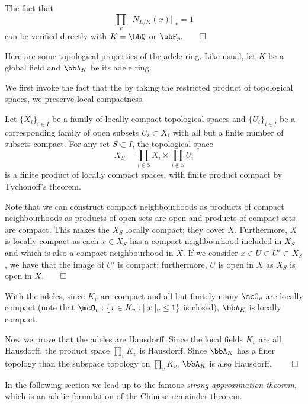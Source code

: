 \documentclass[a4paper, 12pt,oneside,openany]{book}
\begin{document}
The fact that $$\prod\limits_{v} ||N_{L/K}(x)||_v=1$$ can be verified directly with $K=\bbQ$ or $\bbF_p. \qed$ 


Here are some topological properties of the adele ring. Like usual, let $K$ be a global field and $\bbA_K$ be its adele ring.


 We first invoke the fact that the by taking the restricted product of topological spaces, we preserve local compactness. 

Let $\{X_i\}_{i \in I}$ be a family of locally compact topological spaces and $\{U_i\}_{i \in I}$ be a corresponding family of open subsets $U_i \subset X_i$ with all but a finite number of subsets compact. For any set $S \subset I$, the topological space $$X_S = \prod\limits_{i \in S} X_i \times \prod\limits_{i \not\in S} U_i$$ is a finite product of locally compact spaces, with finite product compact by Tychonoff's theorem. 

Note that we can construct compact neighbourhoods as products of compact neighbourhoods as products of open sets are open and products of compact sets are compact. This makes the $X_S$ locally compact; they cover $X$. Furthermore, $X$ is locally compact as each $x\in X_S$ has a compact neighbourhood included in $X_S$ and which is also a compact neighbourhood in $X$. If we consider $x \in U \subset U' \subset X_S$, we have that the image of $U'$ is compact; furthermore, $U$ is open in $X$ as $X_S$ is open in $X. \qed$

With the adeles, since $K_v$ are compact and all but finitely many $\mcO_v$ are locally compact (note that $\mcO_v: \{x \in K_v: ||x||_v \leq 1\}$ is closed), $\bbA_K$ is locally compact.

Now we prove that the adeles are Hausdorff. Since the local fields $K_v$ are all Hausdorff, the product space $\prod_v K_v$ is Hausdorff. Since $\bbA_K$ has a finer topology than the subspace topology on $\prod_v K_v$, $\bbA_K$ is also Hausdorff. $\qed$

In the following section we lead up to the famous \emph{strong approximation theorem}, which is an adelic formulation of the Chinese remainder theorem.

\end{document}
